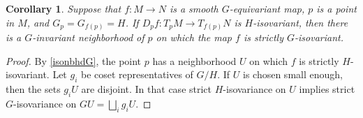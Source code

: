 \documentclass[11pt]{amsart}
\newtheorem{cor}{Corollary}[section]
\theoremstyle{definition}
\numberwithin{equation}{section}
\numberwithin{figure}{section}
\begin{document}
\begin{cor}\label{isonbhdH}
Suppose that $f\colon M\to N$ is a smooth $G$-equivariant map, $p$ is a point in $M$, and $G_p= G_{f(p)}=H$. If $D_p f\colon T_pM\to T_{f(p)}N$ is $H$-isovariant, then there is a $G$-invariant neighborhood of $p$ on which the map $f$ is strictly $G$-isovariant.

\end{cor}

\begin{proof}
By \autoref{isonbhdG}, the point $p$ has a neighborhood $U$ on which $f$ is strictly $H$-isovariant. Let $g_i$ be coset representatives of $G/H$. If $U$ is chosen small enough, then the sets $g_i U$ are disjoint. In that case strict $H$-isovariance on $U$ implies strict $G$-isovariance on $GU=\bigsqcup_i g_i U$.
\end{proof}

\end{document}
